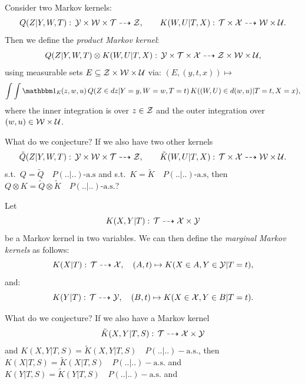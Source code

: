 \begin{Con}[Products]\label{con:nullsets_product-markov-kernels}
Consider two Markov kernels:
\[ Q(Z|Y,W,T):\, \mathcal{Y} \times \mathcal{W}\times \mathcal{T} \dashrightarrow \mathcal{Z},\qquad  
K(W,U|T,X):\, \mathcal{T} \times \mathcal{X} \dashrightarrow \mathcal{W} \times \mathcal{U}. \]
  Then we define the \emph{product Markov kernel}:
  \[ Q(Z|Y,W,T) \otimes K(W,U|T,X) :\, \mathcal{Y} \times  \mathcal{T} \times \mathcal{X} \dashrightarrow \mathcal{Z} \times \mathcal{W} \times \mathcal{U}, \]
  using measurable sets $E \subseteq \mathcal{Z} \times \mathcal{W} \times \mathcal{U}$ via: $(E,(y,t,x)) \mapsto $
  \[\int\int \I_E(z,w,u)\, Q(Z \in dz|Y=y,W=w,T=t) \, K((W,U) \in d(w,u)|T=t,X=x),\]
  where the inner integration is over $z \in \mathcal{Z}$ and the outer integration over $(w,u) \in \mathcal{W}\times \mathcal{U}$.

  What do we conjecture? If we also have two other kernels
  \[ \tilde{Q}(Z|Y,W,T):\, \mathcal{Y} \times \mathcal{W}\times \mathcal{T} \dashrightarrow \mathcal{Z},\qquad  
  \tilde{K}(W,U|T,X):\, \mathcal{T} \times \mathcal{X} \dashrightarrow \mathcal{W} \times \mathcal{U}. \]
  s.t.\ $Q = \tilde{Q} \quad P(..|..)\text{-a.s}$ and
  s.t.\ $K = \tilde{K} \quad P(..|..)\text{-a.s}$, then
  $Q \otimes K = \tilde{Q} \otimes \tilde{K} \quad P(..|..)\text{-a.s.}$?
\end{Con}
\begin{Con}[Marginals]\label{con:nullsets_marginal-markov-kernels}
    Let 
    \[K(X,Y|T):\,\mathcal{T} \dashrightarrow  \mathcal{X} \times \mathcal{Y} \]
    be a Markov kernel in two variables.
    We can then define the \emph{marginal Markov kernels} as follows:
    \[ K(X|T):\, \mathcal{T} \dashrightarrow \mathcal{X},\quad (A,t) \mapsto K(X \in A, Y \in \mathcal{Y}|T=t),  \]
    and:
    \[ K(Y|T):\, \mathcal{T} \dashrightarrow \mathcal{Y},\quad (B,t) \mapsto K(X \in \mathcal{X}, Y \in B|T=t).  \]

    What do we conjecture?
    If we also have a Markov kernel
    \[\tilde{K}(X,Y|T,S):\,\mathcal{T} \dashrightarrow  \mathcal{X} \times \mathcal{Y} \]
    and $K(X,Y|T,S) = \tilde{K}(X,Y|T,S) \quad P(..|..)-\text{a.s.}$, then
    $K(X|T,S) = \tilde{K}(X|T,S) \quad P(..|..)-\text{a.s.}$ and
    $K(Y|T,S) = \tilde{K}(Y|T,S) \quad P(..|..)-\text{a.s.}$ and
\end{Con}
